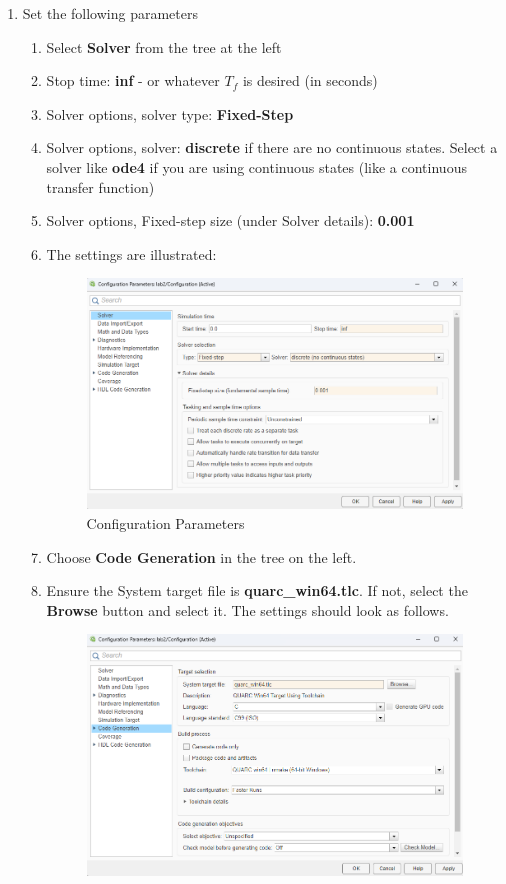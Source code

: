 \documentclass[11pt,letterpaper]{article}
\begin{document}
\begin{enumerate}
  \item Set the following parameters
  \begin{enumerate}
    \item Select \textbf{Solver} from the tree at the left
    \item Stop time: \textbf{inf} - or whatever $T_f$ is desired (in seconds)
    \item Solver options, solver type: \textbf{Fixed-Step}
    \item Solver options, solver: \textbf{discrete} if there are no continuous states. Select a solver like \textbf{ode4} if you are using continuous states (like a continuous transfer function)
    \item Solver options, Fixed-step size (under Solver details): \textbf{0.001}
    \item The settings are illustrated:
    \begin{figure}[H]
      \centering 
      \includegraphics[width=.9\textwidth]{Figures/fig2_solver.png}
      \caption{Configuration Parameters}
      \label{fig:4f_settings}
    \end{figure}
    \item Choose \textbf{Code Generation} in the tree on the left.
    \item Ensure the System target file is \textbf{quarc\_win64.tlc}. If not, select the \textbf{Browse} button and select it. The settings should look as follows. 
    \begin{figure}[H]
      \centering 
      \includegraphics[width=.9\textwidth]{Figures/fig3_codegen.png}

\end{figure}
\end{enumerate}
\end{enumerate}
\end{document}
